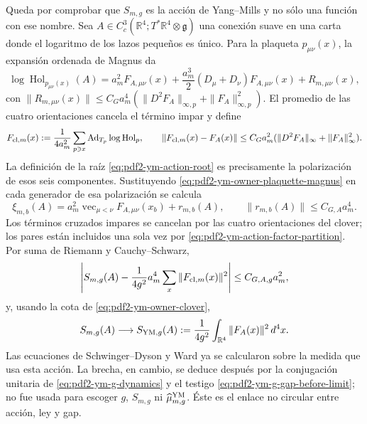 Queda por comprobar que $S_{m,g}$ es la acción de Yang--Mills y no sólo una
función con ese nombre. Sea
$A\in C_c^3(\mathbb R^4;T^*\mathbb R^4\otimes\mathfrak g)$ una conexión suave en
una carta donde el logaritmo de los lazos pequeños es único. Para la plaqueta
$p_{\mu\nu}(x)$, la expansión ordenada de Magnus da
\begin{equation}\label{eq:pdf2-ym-owner-plaquette-magnus}
 \log\operatorname{Hol}_{p_{\mu\nu}(x)}(A)
 =a_m^2F_{A,\mu\nu}(x)
  +\frac{a_m^3}{2}(D_\mu+D_\nu)F_{A,\mu\nu}(x)
  +R_{m,\mu\nu}(x),
\end{equation}
con
$\|R_{m,\mu\nu}(x)\|\le C_G a_m^4
(\|D^2F_A\|_{\infty,p}+\|F_A\|_{\infty,p}^2)$.
El promedio de las cuatro orientaciones cancela el término impar y define
\begin{equation}\label{eq:pdf2-ym-owner-clover}
 F_{{\rm cl},m}(x)
 :=\frac1{4a_m^2}\sum_{p\ni x}
  \operatorname{Ad}_{T_p}\log\operatorname{Hol}_p,
 \qquad
 \|F_{{\rm cl},m}(x)-F_A(x)\|
 \le C_G a_m^2(\|D^2F_A\|_\infty+\|F_A\|_\infty^2).
\end{equation}
La definición de la raíz
\eqref{eq:pdf2-ym-action-root} es precisamente la polarización de esos seis
componentes. Sustituyendo \eqref{eq:pdf2-ym-owner-plaquette-magnus} en cada
generador de esa polarización se calcula
\begin{equation}\label{eq:pdf2-ym-owner-action-root-smooth-chart}
 \xi_{m,b}(A)
 =a_m^2\operatorname{vec}_{\mu<\nu}F_{A,\mu\nu}(x_b)
  +r_{m,b}(A),
 \qquad
 \|r_{m,b}(A)\|\le C_{G,A}a_m^4.
\end{equation}
Los términos cruzados impares se cancelan por las cuatro orientaciones del clover;
los pares están incluidos una sola vez por
\eqref{eq:pdf2-ym-action-factor-partition}. Por suma de Riemann y
Cauchy--Schwarz,
\begin{equation}\label{eq:pdf2-ym-owner-action-error}
 \left|S_{m,g}(A)-\frac1{4g^2}
  a_m^4\sum_x\|F_{{\rm cl},m}(x)\|^2\right|
 \le C_{G,A,g}a_m^2,
\end{equation}
y, usando la cota de \eqref{eq:pdf2-ym-owner-clover},
\begin{equation}\label{eq:pdf2-ym-owner-f2}
 S_{m,g}(A)\longrightarrow
 S_{{\rm YM},g}(A):=\frac1{4g^2}
 \int_{\mathbb R^4}\|F_A(x)\|^2\,d^4x.
\end{equation}
Las ecuaciones de Schwinger--Dyson y Ward ya se calcularon sobre la medida que usa
esta acción. La brecha, en cambio, se deduce después por la conjugación unitaria de
\eqref{eq:pdf2-ym-g-dynamics} y el testigo
\eqref{eq:pdf2-ym-g-gap-before-limit}; no fue usada para escoger $g$, $S_{m,g}$ ni
$\widehat\mu_{m,g}^{\rm YM}$. Éste es el enlace no circular entre acción, ley y gap.


